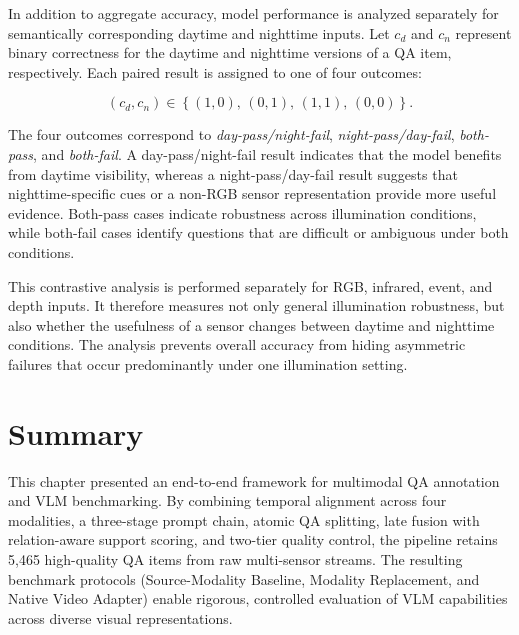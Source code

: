 In addition to aggregate accuracy, model performance is analyzed separately for
semantically corresponding daytime and nighttime inputs. Let $c_d$ and $c_n$
represent binary correctness for the daytime and nighttime versions of a QA
item, respectively. Each paired result is assigned to one of four outcomes:

\begin{equation}
    (c_d,c_n)
    \in
    \left\{
        (1,0),\,
        (0,1),\,
        (1,1),\,
        (0,0)
    \right\}.
    \label{eq:day_night_outcomes}
\end{equation}

The four outcomes correspond to
\textit{day-pass/night-fail},
\textit{night-pass/day-fail},
\textit{both-pass}, and
\textit{both-fail}. A day-pass/night-fail result indicates that the model
benefits from daytime visibility, whereas a night-pass/day-fail result suggests
that nighttime-specific cues or a non-RGB sensor representation provide more
useful evidence. Both-pass cases indicate robustness across illumination
conditions, while both-fail cases identify questions that are difficult or
ambiguous under both conditions.

This contrastive analysis is performed separately for RGB, infrared, event, and
depth inputs. It therefore measures not only general illumination robustness,
but also whether the usefulness of a sensor changes between daytime and
nighttime conditions. The analysis prevents overall accuracy from hiding
asymmetric failures that occur predominantly under one illumination setting.


\section{Summary}
\label{sec:approach_summary}

This chapter presented an end-to-end framework for multimodal QA annotation and VLM benchmarking. By combining temporal alignment across four modalities, a three-stage prompt chain, atomic QA splitting, late fusion with relation-aware support scoring, and two-tier quality control, the pipeline retains 5,465 high-quality QA items from raw multi-sensor streams. The resulting benchmark protocols (Source-Modality Baseline, Modality Replacement, and Native Video Adapter) enable rigorous, controlled evaluation of VLM capabilities across diverse visual representations.
